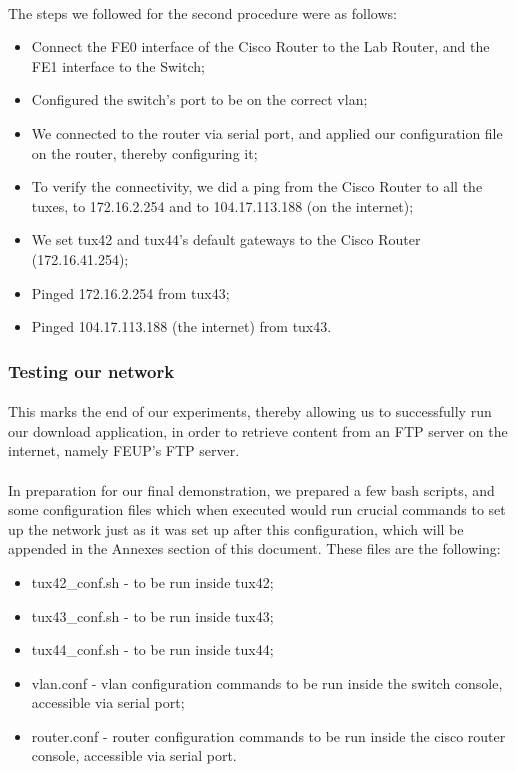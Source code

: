 \documentclass[11pt]{article}
\begin{document}
\paragraph{}The steps we followed for the second procedure were as follows:

\begin{itemize}
    \item Connect the FE0 interface of the Cisco Router to the Lab Router, and the FE1 interface to the Switch;
    \item Configured the switch's port to be on the correct vlan;
    \item We connected to the router via serial port, and applied our configuration file on the router, thereby configuring it;
    \item To verify the connectivity, we did a ping from the Cisco Router to all the tuxes, to 172.16.2.254 and to 104.17.113.188 (on the internet);
    \item We set tux42 and tux44's default gateways to the Cisco Router (172.16.41.254);
    \item Pinged 172.16.2.254 from tux43;
    \item Pinged 104.17.113.188 (the internet) from tux43.
\end{itemize}

\subsubsection*{Testing our network}

\paragraph{}This marks the end of our experiments, thereby allowing us to successfully run our download application, in order to retrieve content from an FTP server on the internet, namely FEUP's FTP server.

\paragraph{}In preparation for our final demonstration, we prepared a few bash scripts, and some configuration files which when executed would run crucial commands to set up the network just as it was set up after this configuration, which will be appended in the Annexes section of this document. These files are the following:

\begin{itemize}
    \item tux42\_conf.sh - to be run inside tux42;
    \item tux43\_conf.sh - to be run inside tux43;
    \item tux44\_conf.sh - to be run inside tux44;
    \item vlan.conf - vlan configuration commands to be run inside the switch console, accessible via serial port;
    \item router.conf - router configuration commands to be run inside the cisco router console, accessible via serial port.
\end{itemize}
\end{document}
